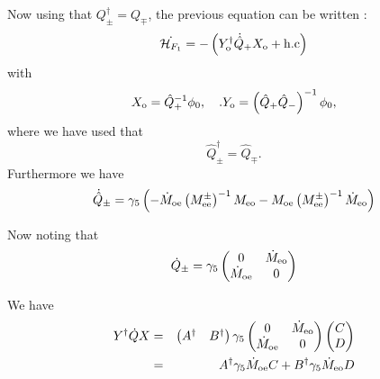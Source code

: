 \documentclass{article}[12pt]
\begin{document}
Now using that   $Q_{\pm} ^{\dagger} = Q_{\mp}$, the previous equation
can be written :
\begin{equation}
\dot{\mathcal{H}_{F_1}} = - \left(Y_{\rm{o}}^{\dagger} \dot{\hat{Q}}_{+} X_{\rm{o}}  + \rm{h.c}\right)
\end{equation}
with
\begin{equation}
  X_{\rm{o}}=\hat{Q}_+^{-1}\phi_0,\quad. Y_{\rm{o}}= \left(\hat{Q}_+
    \hat{Q}_-\right)^{-1} \phi_0,
\end{equation}
where we have used that
\begin{equation}
  \hat{Q}_\pm^{\dagger} = \hat{Q}_\mp.
\end{equation}
Furthermore we have
\begin{equation}
\dot{\hat{Q}}_{\pm} =  \gamma_5 \left( -  \dot{M}_{\rm{oe}}
  \left(M^{\pm}_{\rm{ee}}\right)^{-1} M_{\rm{eo}} -  M_{\rm{oe}}
    \left(M^{\pm}_{\rm{ee}}\right)^{-1} \dot{M}_{\rm{eo}}\right)
\end{equation}

Now noting that
\begin{equation}
  \dot{Q}_{\pm} =  \gamma_5 \begin{pmatrix}
 0  & \dot{M}_{\rm{eo}} \\
\dot{M}_{\rm{oe}} & 0\\
\end{pmatrix}
\end{equation}

We have
\begin{eqnarray}
  Y ^{\dagger} \dot{Q} X  &=& \begin{pmatrix} A^\dagger &
    B^\dagger \end{pmatrix} \gamma_5 \begin{pmatrix}
 0  & \dot{M}_{\rm{eo}} \\
\dot{M}_{\rm{oe}} & 0\\
\end{pmatrix}  \begin{pmatrix} C \\  D \end{pmatrix} \\
&=&  A^\dagger \gamma_5 \dot{M}_{\rm{oe}}  C + B^\dagger \gamma_5 \dot{M}_{\rm{eo}} D
\end{eqnarray}
\end{document}
